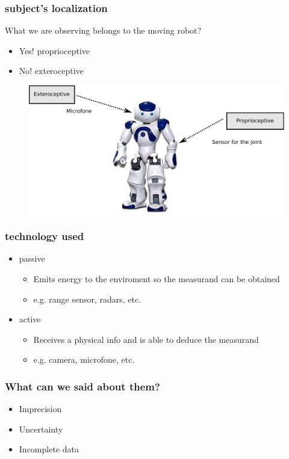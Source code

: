 \documentclass{beamer}
\begin{document}
	\begin{frame}
		\frametitle{subject's localization}
		What we are observing belongs to the moving robot?
		\begin{itemize}
		\item Yes! proprioceptive
		\item No! exteroceptive
		\end{itemize}
		\begin{figure}[h]
			\center
			\includegraphics[scale=0.4]{img/fig:nao:config}
		 \end{figure}		
	\end{frame}

	\begin{frame}
		\frametitle{technology used}

		\begin{itemize}
		\item passive
			\begin{itemize}
				\item Emits energy to the enviroment so the measurand can be obtained
				\item e.g. range sensor, radars, etc.
			\end{itemize}		
		\item active
			\begin{itemize}
				\item Receives a physical info and is able to deduce the measurand
				\item e.g. camera, microfone, etc. 
			\end{itemize}		
		
		\end{itemize}		
		
	\end{frame}
	
	\begin{frame}
		\frametitle{What can we said about them?}
			
		\begin{itemize}
			\item Imprecision
			\item Uncertainty
			\item Incomplete data
		\end{itemize}		
		
	\end{frame}
\end{document}
